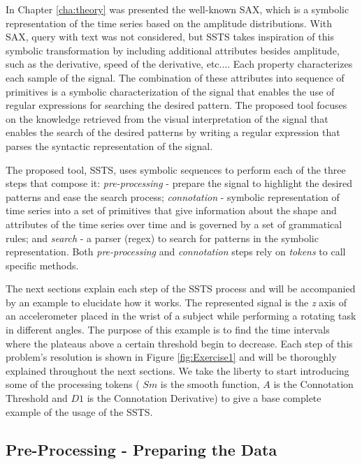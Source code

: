 In Chapter \ref{cha:theory} was presented the well-known \gls{SAX}, which is a symbolic representation of the time series based on the amplitude distributions. With \gls{SAX}, query with text was not considered, but \gls{SSTS} takes inspiration of this symbolic transformation by including additional attributes besides amplitude, such as the derivative, speed of the derivative, etc.... Each property characterizes each sample of the signal. The combination of these attributes into sequence of primitives is a symbolic characterization of the signal that enables the use of regular expressions for searching the desired pattern. The proposed tool focuses on the knowledge retrieved from the visual interpretation of the signal that enables the search of the desired patterns by writing a regular expression that parses the syntactic representation of the signal.
\par
The proposed tool, \gls{SSTS}, uses symbolic sequences to perform each of the three steps that compose it: \textit{pre-processing} - prepare the signal to highlight the desired patterns and ease the search process; \textit{connotation} - symbolic representation of time series into a set of primitives that give information about the shape and attributes of the time series over time and is governed by a set of grammatical rules; and \textit{search} - a parser (\gls{regex}) to search for patterns in the symbolic representation. Both \textit{pre-processing} and \textit{connotation} steps rely on \textit{tokens} to call specific methods.
\par
The next sections explain each step of the \gls{SSTS} process and will be accompanied by an example to elucidate how it works. The represented signal is the \textit{z} axis of an accelerometer placed in the wrist of a subject while performing a rotating task in different angles. The purpose of this example is to find the time intervals where the plateaus above a certain threshold begin to decrease. Each step of this problem's resolution is shown in Figure \ref{fig:Exercise1} and will be thoroughly explained throughout the next sections. We take the liberty to start introducing some of the processing tokens ( $Sm$ is the smooth function, $A$ is the Connotation Threshold and $D1$ is the Connotation Derivative) to give a base complete example of the usage of the \gls{SSTS}.


\subsection{Pre-Processing - Preparing the Data}

